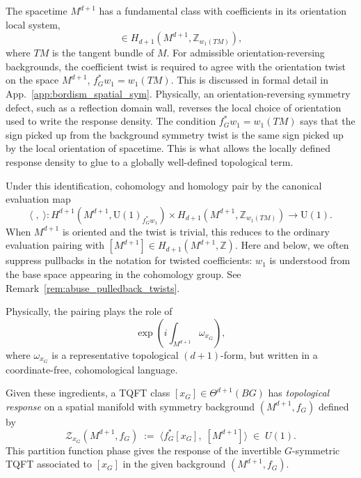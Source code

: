 \documentclass[aps,prx,reprint,superscriptaddress,twocolumn,amsmath,amssymb,amsfonts, nofootinbib]{revtex4-2}
\newcommand{\U}{\text{U}}
\theoremstyle{apsstyle}
\begin{document}
The spacetime $M^{d+1}$ has a fundamental class with coefficients in its orientation local system,
\begin{equation*}
    [M^{d+1}] \in H_{d+1}(M^{d+1},\mathbb Z_{w_{1}(TM)}),
\end{equation*} where $TM$ is the tangent bundle of $M.$ For admissible orientation-reversing backgrounds, the coefficient twist is required to agree with the orientation twist on the space $M^{d+1}$, $f_G^{*}w_{1}=w_{1}(TM)$. This is discussed in formal detail in App.~\ref{app:bordism_spatial_sym}. Physically, an orientation-reversing symmetry defect, such as a reflection domain wall, reverses the local choice of orientation used to write the response density. The condition $f_G^{*}w_{1}=w_{1}(TM)$ says that the sign picked up from the background symmetry twist is the same sign picked up by the local orientation of spacetime. This is what allows the locally defined response density to glue to a globally well-defined topological term.

\medskip 

 Under this identification, cohomology and homology pair by the canonical evaluation map
\begin{equation}
    \langle\;,\;\rangle: H^{d+1}(M^{d+1},\U(1)_{f_G^{*}w_{1}}) \times 
    H_{d+1}(M^{d+1},\mathbb Z_{w_{1}(TM)}) \longrightarrow \U(1).
    \label{eq:evaluation_pairing}
\end{equation}
When $M^{d+1}$ is oriented and the twist is trivial, this reduces to the ordinary evaluation pairing with $[M^{d+1}]\in H_{d+1}(M^{d+1},\mathbb Z)$. Here and below, we often suppress pullbacks in the notation for twisted coefficients: $w_1$ is understood from the base space appearing in the cohomology group. See Remark~\ref{rem:abuse_pulledback_twists}. 

\medskip

\noindent Physically, the pairing plays the role of 
\begin{equation*}
  \exp\left( i \int_{M^{d+1}} \omega_{x_{G}} \right),
\end{equation*}
where $\omega_{x_{G}}$ is a representative topological $(d{+}1)$-form, but written in a coordinate-free, cohomological language.




\medskip

 Given these ingredients, a TQFT class $[x_{G}]\in\Theta^{d+1}(BG)$ has \emph{topological response} on a spatial manifold with symmetry background $(M^{d+1},f_G)$ defined by
\begin{equation}
    \mathcal Z_{x_{G}}(M^{d+1}, f_{G})
    \;:=\;
    \big\langle f_{G}^{*}[x_{G}],\; [M^{d+1}] \big\rangle
    \;\in\; U(1).
    \label{eq:top-response}
\end{equation}
This partition function phase gives the response of the invertible $G$-symmetric TQFT associated to $[x_{G}]$ in the given background $(M^{d+1}, f_{G})$.
\end{document}
